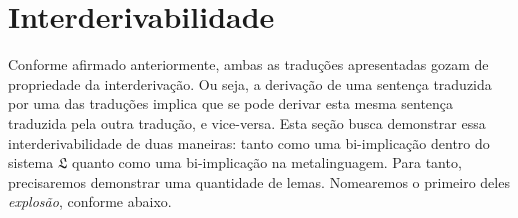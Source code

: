 \section{Interderivabilidade}

Conforme afirmado anteriormente, ambas as traduções apresentadas gozam de propriedade da interderivação.
Ou seja, a derivação de uma sentença traduzida por uma das traduções implica que se pode derivar esta mesma sentença traduzida pela outra tradução, e vice-versa.
Esta seção busca demonstrar essa interderivabilidade de duas maneiras: tanto como uma bi-implicação dentro do sistema $\mathfrak{L}$ quanto como uma bi-implicação na metalinguagem.
Para tanto, precisaremos demonstrar uma quantidade de lemas.
Nomearemos o primeiro deles \emph{explosão}, conforme abaixo.

\vspace{\baselineskip}
